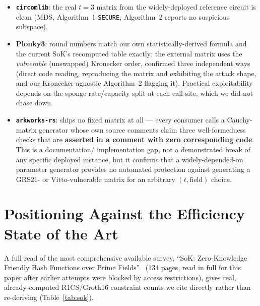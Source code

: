 \documentclass[11pt]{article}
\begin{document}
\begin{itemize}[leftmargin=1.4em]
  \item \textbf{\texttt{circomlib}}: the real $t=3$ matrix from the
  widely-deployed reference circuit is clean (MDS, Algorithm~1
  \texttt{SECURE}, Algorithm~2 reports no suspicious subspace).
  \item \textbf{Plonky3}: round numbers match our own
  statistically-derived formula and the current SoK's recomputed table
  exactly; the external matrix uses the \emph{vulnerable} (unswapped)
  Kronecker order, confirmed three independent ways (direct code reading,
  reproducing the matrix and exhibiting the attack shape, and our
  Kronecker-agnostic Algorithm~2 flagging it). Practical exploitability
  depends on the sponge rate/capacity split at each call site, which we
  did not chase down.
  \item \textbf{\texttt{arkworks-rs}}: ships no fixed matrix at all ---
  every consumer calls a Cauchy-matrix generator whose own source comments
  claim three well-formedness checks that are \textbf{asserted in a
  comment with zero corresponding code}. This is a documentation/
  implementation gap, not a demonstrated break of any specific deployed
  instance, but it confirms that a widely-depended-on parameter generator
  provides no automated protection against generating a GRS21- or
  Vitto-vulnerable matrix for an arbitrary $(t,\text{field})$ choice.
\end{itemize}

\section{Positioning Against the Efficiency State of the Art}

A full read of the most comprehensive available survey, ``SoK:
Zero-Knowledge Friendly Hash Functions over Prime
Fields''~\cite{sok2026} (134 pages, read in full for this paper
after earlier attempts were blocked by access restrictions), gives real,
already-computed R1CS/Groth16 constraint counts we cite directly rather
than re-deriving (Table~\ref{tab:sok}).
\label{sec:sok}
\end{document}
